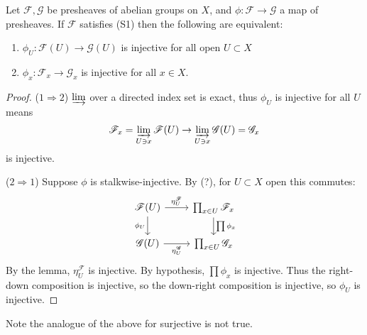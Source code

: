 \documentclass[12pt]{article}
\begin{document}
\begin{proposition}
	Let $\mathscr{F},\mathscr{G}$ be presheaves of abelian groups on $X$, and $\phi:\mathscr{F}\to\mathscr{G}$ a map of presheaves. If $\mathscr{F}$ satisfies (S1) then the following are equivalent:
	\begin{enumerate}
		\item $\phi_U:\mathscr{F}(U)\to\mathscr{G}(U)$ is injective for all open $U\subset X$
		\item $\phi_x:\mathscr{F}_x\to\mathscr{G}_x$ is injective for all $x\in X$.
	\end{enumerate}
\end{proposition}
\begin{proof}
	($1\Rightarrow 2$) $\varinjlim$ over a directed index set is exact, thus $\phi_U$ is injective for all $U$ means 
	\begin{equation*}
		\mathscr{F}_x=\varinjlim_{U\ni x}\mathscr{F}(U) \to \varinjlim_{U\ni x}\mathscr{G}(U)=\mathscr{G}_x
	\end{equation*}
	is injective.

	($2\Rightarrow 1$) Suppose $\phi$ is stalkwise-injective. By (?), for $U\subset X$ open this commutes: 
	\begin{equation*}
\begin{tikzcd}
\mathscr{F}(U) \arrow[r, "\eta_U^\mathscr{F}"] \arrow[d, "\phi_U"'] & \prod_{x\in U}\mathscr{F}_x \arrow[d, "\prod\phi_x"] \\
\mathscr{G}(U) \arrow[r, "\eta_U^\mathscr{G}"']                     & \prod_{x\in U}\mathscr{G}_x                         
\end{tikzcd}
	\end{equation*}
	By the lemma, $\eta_U^\mathscr{F}$ is injective. By hypothesis, $\prod\phi_x$ is injective. Thus the right-down composition is injective, so the down-right composition is injective, so $\phi_U$ is injective.
\end{proof}

\begin{remark}
	Note the analogue of the above for surjective is not true.
\end{remark}

\end{document}
